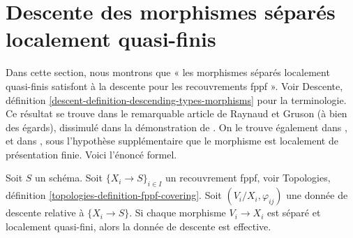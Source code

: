 \section{Descente des morphismes séparés localement quasi-finis}
\label{section-separated-locally-quasi-finite}

\noindent
Dans cette section, nous montrons que « les morphismes séparés localement quasi-finis
satisfont à la descente pour les recouvrements fppf ». Voir Descente, définition
\ref{descent-definition-descending-types-morphisms} pour la terminologie.
Ce résultat se trouve dans le remarquable article de Raynaud et Gruson
(à bien des égards), dissimulé dans la démonstration
de \cite[Lemme 5.7.1]{GruRay}.
On le trouve également dans \cite{Murre-representation}, et dans
\cite[Expos\'e X, Lemme 5.4]{SGA3},
sous l'hypothèse supplémentaire
que le morphisme est localement de présentation finie.
Voici l'énoncé formel.

\begin{lemma}
\label{lemma-separated-locally-quasi-finite-morphisms-fppf-descend}
Soit $S$ un schéma.
Soit $\{X_i \to S\}_{i\in I}$ un recouvrement fppf, voir
Topologies, définition \ref{topologies-definition-fppf-covering}.
Soit $(V_i/X_i, \varphi_{ij})$ une donnée de descente
relative à $\{X_i \to S\}$. Si chaque morphisme
$V_i \to X_i$ est séparé et localement quasi-fini,
alors la donnée de descente est effective.
\end{lemma}


